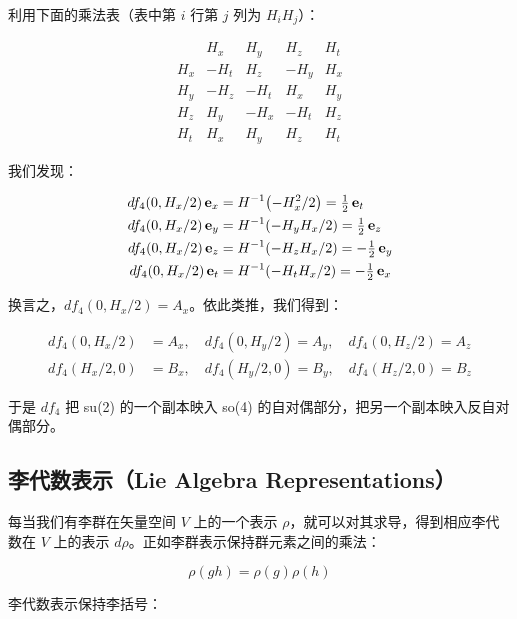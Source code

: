 利用下面的乘法表（表中第 $i$ 行第 $j$ 列为 $H_i H_j$）：

\begin{equation}
\begin{array}{c|cccc}
 & H_x & H_y & H_z & H_t \\ \hline
H_x & -H_t & H_z & -H_y & H_x \\
H_y & -H_z & -H_t & H_x & H_y \\
H_z & H_y & -H_x & -H_t & H_z \\
H_t & H_x & H_y & H_z & H_t
\end{array}
\end{equation}

我们发现：

\begin{align}
df_4(0, H_x/2)\,\mathbf{e}_x &= H^{-1}\!\left(-H_x^{2}/2\right) = \tfrac{1}{2}\,\mathbf{e}_t \\
df_4(0, H_x/2)\,\mathbf{e}_y &= H^{-1}\!\left(-H_y H_x/2\right) = \tfrac{1}{2}\,\mathbf{e}_z \\
df_4(0, H_x/2)\,\mathbf{e}_z &= H^{-1}\!\left(-H_z H_x/2\right) = -\tfrac{1}{2}\,\mathbf{e}_y \\
df_4(0, H_x/2)\,\mathbf{e}_t &= H^{-1}\!\left(-H_t H_x/2\right) = -\tfrac{1}{2}\,\mathbf{e}_x
\end{align}

换言之，$df_4(0,H_x/2)=A_x$。依此类推，我们得到：

\begin{align}
df_4(0, H_x/2) &= A_x, \quad df_4(0, H_y/2) = A_y, \quad df_4(0, H_z/2) = A_z \\
df_4(H_x/2, 0) &= B_x, \quad df_4(H_y/2, 0) = B_y, \quad df_4(H_z/2, 0) = B_z
\end{align}

于是 $df_4$ 把 su(2) 的一个副本映入 so(4) 的自对偶部分，把另一个副本映入反自对偶部分。

\subsection{李代数表示（Lie Algebra Representations）}

每当我们有李群在矢量空间 $V$ 上的一个表示 $\rho$，就可以对其求导，得到相应李代数在 $V$ 上的表示 $d\rho$。正如李群表示保持群元素之间的乘法：

\begin{equation}
\rho(gh) = \rho(g)\rho(h)
\end{equation}

李代数表示保持李括号：

